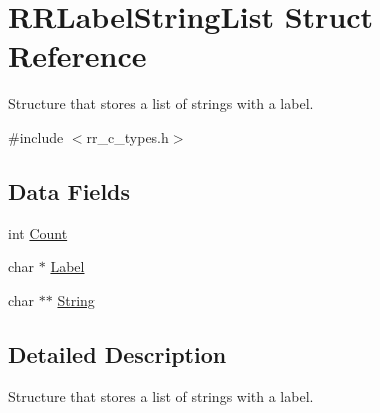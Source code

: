 \hypertarget{struct_r_r_label_string_list}{
\section{\-R\-R\-Label\-String\-List \-Struct \-Reference}
\label{struct_r_r_label_string_list}
}


\-Structure that stores a list of strings with a label.  




{\ttfamily \#include $<$rr\-\_\-c\-\_\-types.\-h$>$}

\subsection*{\-Data \-Fields}
\begin{DoxyCompactItemize}
\item 
int \hyperlink{struct_r_r_label_string_list_aad462966ed963f892117056de1eba502}{\-Count}
\item 
char $\ast$ \hyperlink{struct_r_r_label_string_list_af91fd2b26f73a15052d23933bee0ed5a}{\-Label}
\item 
char $\ast$$\ast$ \hyperlink{struct_r_r_label_string_list_acdbc34377baf3e52d9044aada0f2f511}{\-String}
\end{DoxyCompactItemize}


\subsection{\-Detailed \-Description}
\-Structure that stores a list of strings with a label. 

